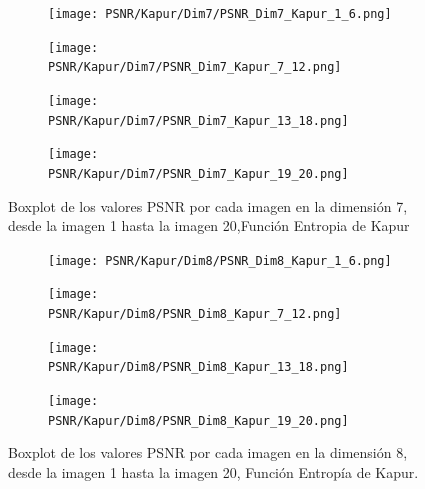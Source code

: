 \documentclass[conference]{IEEEtran}
\begin{document}
\begin{figure}[htbp]
	\centering
	\begin{subfigure}{0.4\textwidth}
		\texttt{[image: PSNR/Kapur/Dim7/PSNR\_Dim7\_Kapur\_1\_6.png]}
	\end{subfigure}
	
	\begin{subfigure}{0.4\textwidth}
		\texttt{[image: PSNR/Kapur/Dim7/PSNR\_Dim7\_Kapur\_7\_12.png]}
	\end{subfigure}
	\begin{subfigure}{0.4\textwidth}
		\texttt{[image: PSNR/Kapur/Dim7/PSNR\_Dim7\_Kapur\_13\_18.png]}
	\end{subfigure}  
	\begin{subfigure}{0.4\textwidth}
		\texttt{[image: PSNR/Kapur/Dim7/PSNR\_Dim7\_Kapur\_19\_20.png]}
		\vspace{-120pt} %
	\end{subfigure}
	\caption{Boxplot de los valores PSNR por cada imagen en la dimensión 7, desde la imagen 1 hasta la imagen 20,Función Entropia de Kapur}
	\label{fig:imagenes}    
\end{figure}

\begin{figure}[htbp] %
	\centering %
	\begin{subfigure}{0.4\textwidth}
		\texttt{[image: PSNR/Kapur/Dim8/PSNR\_Dim8\_Kapur\_1\_6.png]}
	\end{subfigure}
	
	\begin{subfigure}{0.4\textwidth}
		\texttt{[image: PSNR/Kapur/Dim8/PSNR\_Dim8\_Kapur\_7\_12.png]}
	\end{subfigure}
	
	\begin{subfigure}{0.4\textwidth}
		\texttt{[image: PSNR/Kapur/Dim8/PSNR\_Dim8\_Kapur\_13\_18.png]}
	\end{subfigure}
	
	\begin{subfigure}{0.4\textwidth}
		\texttt{[image: PSNR/Kapur/Dim8/PSNR\_Dim8\_Kapur\_19\_20.png]}
		\vspace{-120pt} %
	\end{subfigure}
	\caption{Boxplot de los valores PSNR por cada imagen en la dimensión 8, desde la imagen 1 hasta la imagen 20, Función Entropía de Kapur.}
	\label{fig:imagenes_dim8_1_20}    
\end{figure}
\end{document}
